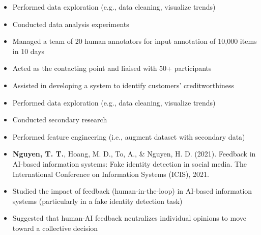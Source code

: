 \documentclass[10pt,a4paper,ragged2e]{altacv}
\begin{document}
\begin{paracol}{2}
\divider

\begin{itemize}
	\item Performed data exploration (e.g., data cleaning, visualize trends)
	\item Conducted data analysis experiments
	\item Managed a team of 20 human annotators for input annotation of 10,000 items in 10 days
	\item Acted as the contacting point and liaised with 50+ participants
\end{itemize}

\divider

\begin{itemize}
	\item Assisted in developing a system to identify customers' creditworthiness
	\item Performed data exploration (e.g., data cleaning, visualize trends)
	\item Conducted secondary research
	\item Performed feature engineering (i.e., augment dataset with secondary data)
\end{itemize}

\switchcolumn


\begin{itemize}
	\item \textbf{Nguyen, T. T.}, Hoang, M. D., To, A., \& Nguyen, H. D. (2021). Feedback in AI-based information systems: Fake identity detection in social media. The International Conference on Information Systems (ICIS), 2021.
	\item Studied the impact of feedback (human-in-the-loop) in AI-based information systems (particularly in a fake identity detection task)
	\item Suggested that human-AI feedback neutralizes individual opinions to move toward a collective decision
\end{itemize}


\end{paracol}
\end{document}
